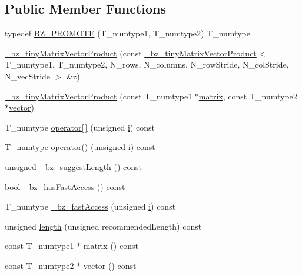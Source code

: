 \subsection*{Public Member Functions}
\begin{DoxyCompactItemize}
\item 
typedef \hyperlink{class__bz__tinyMatrixVectorProduct_af44bdfbf40c78d10155eaa7730821ec3}{B\+Z\+\_\+\+P\+R\+O\+M\+O\+T\+E} (T\+\_\+numtype1, T\+\_\+numtype2) T\+\_\+numtype
\item 
\hyperlink{class__bz__tinyMatrixVectorProduct_a953bb2553da3325265d240807bcfdfb0}{\+\_\+bz\+\_\+tiny\+Matrix\+Vector\+Product} (const \hyperlink{class__bz__tinyMatrixVectorProduct}{\+\_\+bz\+\_\+tiny\+Matrix\+Vector\+Product}$<$ T\+\_\+numtype1, T\+\_\+numtype2, N\+\_\+rows, N\+\_\+columns, N\+\_\+row\+Stride, N\+\_\+col\+Stride, N\+\_\+vec\+Stride $>$ \&z)
\item 
\hyperlink{class__bz__tinyMatrixVectorProduct_a6cbb64224ea5f3304af579d78b866695}{\+\_\+bz\+\_\+tiny\+Matrix\+Vector\+Product} (const T\+\_\+numtype1 $\ast$\hyperlink{class__bz__tinyMatrixVectorProduct_acfe460340531b7297c0e6f643436288c}{matrix}, const T\+\_\+numtype2 $\ast$\hyperlink{class__bz__tinyMatrixVectorProduct_ac234dfd8b6637dfdb02d66e74b7c93c8}{vector})
\item 
T\+\_\+numtype \hyperlink{class__bz__tinyMatrixVectorProduct_a22ee044d1a4f5bd763bd360e99cfc6d2}{operator\mbox{[}$\,$\mbox{]}} (unsigned \hyperlink{indexexpr_8h_aabd77643995707c185e95c8cb2782c81}{i}) const 
\item 
T\+\_\+numtype \hyperlink{class__bz__tinyMatrixVectorProduct_a97f0601d328f372fcbb0138372a77e1a}{operator()} (unsigned \hyperlink{indexexpr_8h_aabd77643995707c185e95c8cb2782c81}{i}) const 
\item 
unsigned \hyperlink{class__bz__tinyMatrixVectorProduct_aa86a6e74bdd705fa847d89f20b66054e}{\+\_\+bz\+\_\+suggest\+Length} () const 
\item 
\hyperlink{compiler_8h_abb452686968e48b67397da5f97445f5b}{bool} \hyperlink{class__bz__tinyMatrixVectorProduct_a91fd7fcb957ad1e61709c6a7623f6851}{\+\_\+bz\+\_\+has\+Fast\+Access} () const 
\item 
T\+\_\+numtype \hyperlink{class__bz__tinyMatrixVectorProduct_af4cc05d086b44e12c0039285c74cd51e}{\+\_\+bz\+\_\+fast\+Access} (unsigned \hyperlink{indexexpr_8h_aabd77643995707c185e95c8cb2782c81}{i}) const 
\item 
unsigned \hyperlink{class__bz__tinyMatrixVectorProduct_a4e3227112a2ebd6d3c857df0da63298e}{length} (unsigned recommended\+Length) const 
\item 
const T\+\_\+numtype1 $\ast$ \hyperlink{class__bz__tinyMatrixVectorProduct_acfe460340531b7297c0e6f643436288c}{matrix} () const 
\item 
const T\+\_\+numtype2 $\ast$ \hyperlink{class__bz__tinyMatrixVectorProduct_ac234dfd8b6637dfdb02d66e74b7c93c8}{vector} () const 
\end{DoxyCompactItemize}
